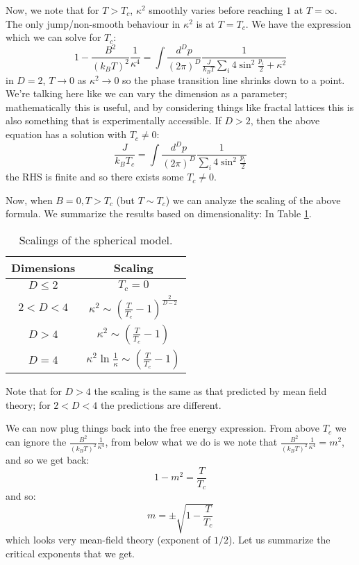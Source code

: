 Now, we note that for $T > T_c$, $\kappa^2$ smoothly varies before reaching $1$ at $T = \infty$. The only jump/non-smooth behaviour in $\kappa^2$ is at $T = T_c$. We have the expression which we can solve for $T_c$:
\begin{equation}
    1 - \frac{B^2}{(k_B T)^2}\frac{1}{\kappa^4} = \int \frac{d^Dp}{(2\pi)^D} \frac{1}{\frac{J}{k_B T}\sum_i 4\sin^2\frac{p_i}{2} + \kappa^2}
\end{equation}
in $D = 2$, $T \to 0$ as $\kappa^2 \to 0$ so the phase transition line shrinks down to a point. We're talking here like we can vary the dimension as a parameter; mathematically this is useful, and by considering things like fractal lattices this is also something that is experimentally accessible. If $D > 2$, then the above equation has a solution with $T_c \neq 0$:
\begin{equation}
    \frac{J}{k_B T_c} = \int \frac{d^Dp}{(2\pi)^D}\frac{1}{\sum_i 4\sin^2\frac{p_i}{2}}
\end{equation}
the RHS is finite and so there exists some $T_c \neq 0$. 

Now, when $B = 0, T > T_c$ (but $T \sim T_c$) we can analyze the scaling of the above formula. We summarize the results based on  dimensionality: In Table \ref{table-sphericalscaling}.

\begin{table}[htbp]
    \centering\begin{tabular}{|c|c|}
        Dimensions & Scaling
        \\ \hline $D \leq 2$ & $T_c = 0$
        \\ $2 < D < 4$ & $\kappa^2 \sim \left(\frac{T}{T_c} - 1\right)^{\frac{2}{D - 2}}$
        \\ $D > 4$ & $\kappa^2 \sim \left(\frac{T}{T_c} - 1\right)$
        \\ $D = 4$ & $\kappa^2\ln\frac{1}{\kappa} \sim \left(\frac{T}{T_c} - 1\right)$
    \end{tabular}
    \caption{Scalings of the spherical model.}
    \label{table-sphericalscaling}
\end{table}

Note that for $D > 4$ the scaling is the same as that predicted by mean field theory; for $2 < D < 4$ the predictions are different.

We can now plug things back into the free energy expression. From above $T_c$ we can ignore the $\frac{B^2}{(k_B T)^2}\frac{1}{\kappa^4}$, from below what we do is we note that $\frac{B^2}{(k_B T)^2}\frac{1}{\kappa^4} = m^2$, and so we get back:
\begin{equation}
    1 - m^2 = \frac{T}{T_c}
\end{equation}
and so:
\begin{equation}
    m = \pm \sqrt{1 - \frac{T}{T_c}}
\end{equation}
which looks very mean-field theory (exponent of $1/2$). Let us summarize the critical exponents that we get.

